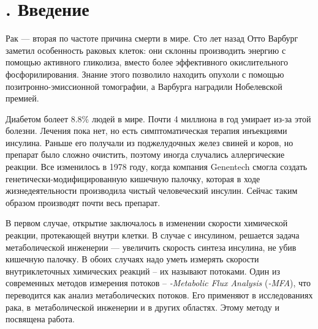 \documentclass[14pt, a4paper]{extreport}
\begin{document}
\chapter[Введение]{\thechapter{}. Введение}
Рак --- вторая по частоте причина смерти в мире\cite{Cancer_statistics}. Сто лет назад Отто Варбург заметил\cite{Warburg_effect} особенность раковых клеток: они склонны производить энергию с помощью активного гликолиза, вместо более эффективного окислительного фосфорилирования. Знание этого позволило находить опухоли с помощью позитронно-эмиссионной томографии, а Варбурга наградили Нобелевской премией.

Диабетом болеет 8.8\% людей в мире\cite{Diabetes_statistics}. Почти 4 миллиона в год умирает из-за этой болезни. Лечения пока нет, но есть симптоматическая терапия инъекциями инсулина. Раньше его получали из поджелудочных желез свиней и коров, но препарат было сложно очистить, поэтому иногда случались аллергические реакции. Все изменилось в 1978 году, когда компания Genentech смогла создать генетически-модифицированную кишечную палочку, которая в ходе жизнедеятельности производила чистый человеческий инсулин\cite{Genentech_paper}. Сейчас таким образом производят почти весь препарат.

В первом случае, открытие заключалось в изменении скорости химической реакции, протекающей внутри клетки. В случае с инсулином, решается задача метаболической инженерии --- увеличить скорость синтеза инсулина, не убив кишечную палочку. В обоих случаях надо уметь измерять скорости внутриклеточных химических реакций -- их называют потоками. Один из современных методов измерения потоков -- \emph{-Metabolic Flux Analysis} (\emph{-MFA}), что переводится как анализ метаболических потоков. Его применяют в исследованиях рака\cite{Application_cancer_2009, Application_cancer_2012, Application_cancer_2013, Application_cancer_2015, Application_cancer_2017, Application_cancer_2018, Application_cancer_2018_2}, в~метаболической инженерии\cite{Application_engeneering_2009, Application_engeneering_2015, Application_engeneering_2017} и в других областях\cite{Application_other_2011, Application_other_2013, Application_other_2014}. Этому методу и посвящена работа.
\end{document}
